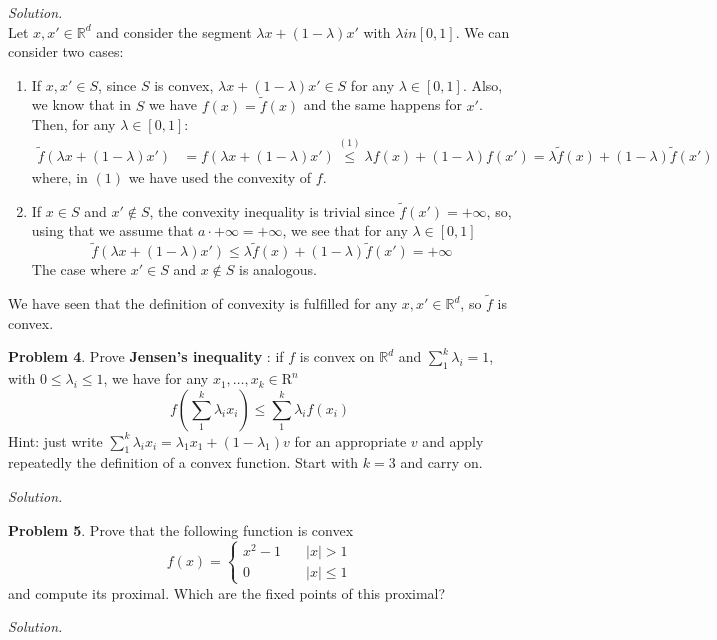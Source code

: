 \documentclass[a4paper]{article}
\newenvironment{problem}[2][Problem]
    { \begin{mdframed}[backgroundcolor=gray!20] \vspace*{0.1cm} \textbf{#1 #2}.}
    {  \end{mdframed}\vspace{0.3cm}}
\newenvironment{solution}
    {\textit{Solution.}\\}
    {}
\newcommand{\R}{\mathbb R}
\begin{document}
\begin{solution}

Let \(x,x' \in \R^d\) and consider the segment \(\lambda x + (1-\lambda)x'\) with \(\lambda in [0,1]\). We can consider two cases:

\begin{enumerate}
\item If \(x,x' \in S\), since \(S\) is convex, \(\lambda x + (1-\lambda)x' \in S\) for any \(\lambda \in [0,1]\). Also, we know that in \(S\) we have \(f(x) = \tilde f(x)\) and the same happens for \(x'\). Then, for any \(\lambda \in [0,1]\):
\begin{align*}
  \tilde f(\lambda x + (1-\lambda)x') & = f(\lambda x + (1-\lambda)x') \stackrel{(1)}{\leq}\lambda f(x) + (1-\lambda )f(x') = \lambda \tilde f(x) + (1-\lambda) \tilde f(x')
\end{align*}
        where, in \((1)\) we have used the convexity of \(f\).

  \item If \(x \in S\) and \(x' \notin S\), the convexity inequality is trivial since \(\tilde f(x') = +\infty\), so, using that we assume that \(a \cdot +\infty = +\infty\), we see that for any \(\lambda \in [0,1]\)
        \[
        \tilde f ( \lambda x + (1-\lambda)x' ) \leq \lambda \tilde f(x) + (1-\lambda) \tilde f(x') = + \infty
        \]
  The case where \(x' \in S\) and \(x \notin S\) is analogous.
\end{enumerate}

We have seen that the definition of convexity is fulfilled for any \(x,x' \in \R^{d}\), so \(\tilde f\) is convex.
\end{solution}

\begin{problem}{4}
  Prove \textbf{Jensen's inequality} : if \(f\) is convex on \(\R^{d}\) and \(\sum_{1}^{k} \lambda_{i}=1\), with \(0 \leq \lambda_{i} \leq 1\), we have for any \(x_{1}, \ldots, x_{k} \in \mathrm{R}^{n}\)
    \[
        f\left(\sum_{1}^{k} \lambda_{i} x_{i}\right) \leq \sum_{1}^{k} \lambda_{i} f\left(x_{i}\right)
    \]
    Hint: just write \(\sum_{1}^{k} \lambda_{i} x_{i}=\lambda_{1} x_{1}+\left(1-\lambda_{1}\right)v\)  for an appropriate \(v\) and apply repeatedly the definition of a convex function. Start with \(k=3\) and carry on.
\end{problem}

\begin{solution}

\end{solution}

\begin{problem}{5}
    Prove that the following function is convex
    \[
    f(x) =
    \begin{cases}
        x^{2}-1 \quad & |x|>1 \\
        0  \quad & |x| \leq 1
    \end{cases}
    \]
    and compute its proximal. Which are the fixed points of this proximal?
\end{problem}

\begin{solution}

\end{solution}
\end{document}
